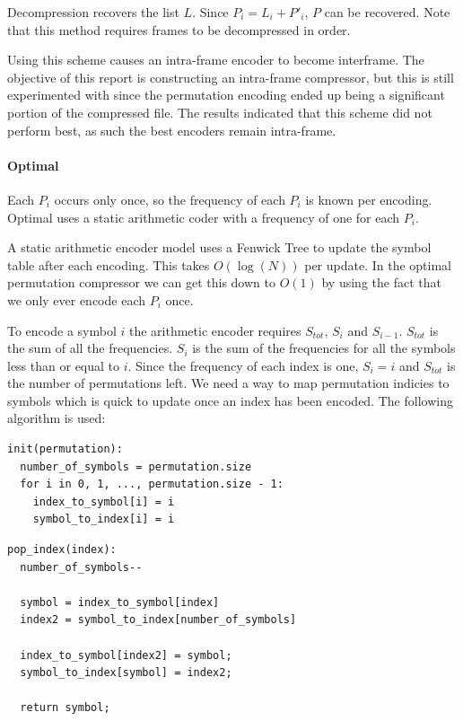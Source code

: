 \documentclass[a4paper]{report}
\begin{document}
Decompression recovers the list $L$. Since $P_i = L_i + P'_i$, $P$ can be
recovered. Note that this method requires frames to be decompressed in order.

Using this scheme causes an intra-frame encoder to become interframe. The
objective of this report is constructing an intra-frame compressor, but this
is still experimented with since the permutation encoding ended up being a
significant portion of the compressed file. The results indicated that this
scheme did not perform best, as such the best encoders remain intra-frame.

\paragraph{Optimal}
Each $P_i$ occurs only once, so the frequency of each $P_i$ is known per
encoding. Optimal uses a static arithmetic coder with a frequency of one for
each $P_i$.

A static arithmetic encoder model uses a Fenwick Tree \citep{fenwick1994new}
to update the symbol table after each encoding. This takes $O(\log(N))$ per
update. In the optimal permutation compressor we can get this down to $O(1)$
by using the fact that we only ever encode each $P_i$ once.

To encode a symbol $i$ the arithmetic encoder requires $S_{tot}$, $S_i$ and
$S_{i-1}$. $S_{tot}$ is the sum of all the frequencies. $S_i$ is the sum of
the frequencies for all the symbols less than or equal to $i$. Since the
frequency of each index is one, $S_i = i$ and $S_{tot}$ is the number of
permutations left. We need a way to map permutation indicies to symbols which
is quick to update once an index has been encoded. The following algorithm is
used:

\begin{verbatim}
init(permutation):
  number_of_symbols = permutation.size
  for i in 0, 1, ..., permutation.size - 1:
    index_to_symbol[i] = i
    symbol_to_index[i] = i
\end{verbatim}

\begin{verbatim}
pop_index(index):
  number_of_symbols--

  symbol = index_to_symbol[index]
  index2 = symbol_to_index[number_of_symbols]

  index_to_symbol[index2] = symbol;
  symbol_to_index[symbol] = index2;

  return symbol;
\end{verbatim}
\end{document}
